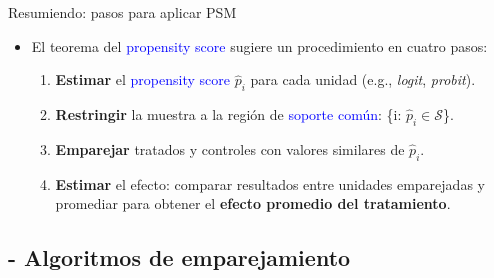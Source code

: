 \documentclass[10pt, xcolor=dvipsnames]{beamer}
\begin{document}
\begin{frame}{Resumiendo: pasos para aplicar PSM}
\begin{itemize}
    \item El teorema del \textcolor{blue}{propensity score} sugiere un procedimiento en cuatro pasos:
    \smallspace
    \begin{enumerate}
        \item \textbf{Estimar} el \textcolor{blue}{propensity score} \(\hat{p}_i\) para cada unidad (e.g., \textit{logit}, \textit{probit}). %
        \smallspace
        \item \textbf{Restringir} la muestra a la región de \textcolor{blue}{soporte común}: \{i: \(\hat{p}_i \in \mathcal{S}\)\}. %
        \smallspace
        \item \textbf{Emparejar} tratados y controles con valores similares de \(\hat{p}_i\). %
        \smallspace
        \item \textbf{Estimar} el efecto: comparar resultados entre unidades emparejadas y promediar para obtener el \textbf{efecto promedio del tratamiento}.
    \end{enumerate}
\end{itemize}
\end{frame}


\subsection{- Algoritmos de emparejamiento}
\end{document}
